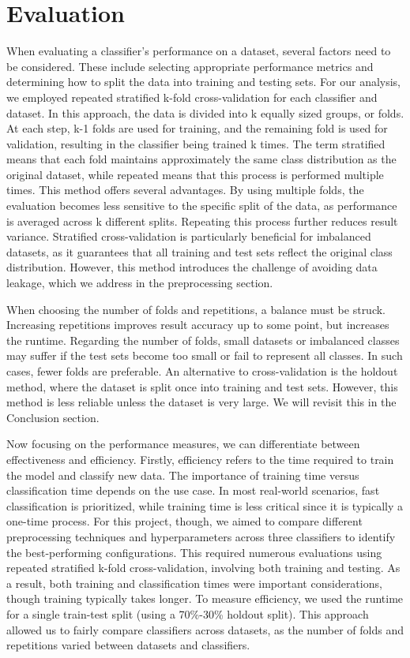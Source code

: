 \documentclass[a4paper,10pt]{article}
\begin{document}
\section{Evaluation}

When evaluating a classifier's performance on a dataset, several factors need to be considered. These include selecting appropriate performance metrics and determining how to split the data into training and testing sets. For our analysis, we employed repeated stratified k-fold cross-validation for each classifier and dataset. In this approach, the data is divided into k equally sized groups, or folds. At each step, k-1 folds are used for training, and the remaining fold is used for validation, resulting in the classifier being trained k times. The term stratified means that each fold maintains approximately the same class distribution as the original dataset, while repeated means that this process is performed multiple times. This method offers several advantages. By using multiple folds, the evaluation becomes less sensitive to the specific split of the data, as performance is averaged across k different splits. Repeating this process further reduces result variance. Stratified cross-validation is particularly beneficial for imbalanced datasets, as it guarantees that all training and test sets reflect the original class distribution. However, this method introduces the challenge of avoiding data leakage, which we address in the preprocessing section.

When choosing the number of folds and repetitions, a balance must be struck. Increasing repetitions improves result accuracy up to some point, but increases the runtime. Regarding the number of folds, small datasets or imbalanced classes may suffer if the test sets become too small or fail to represent all classes. In such cases, fewer folds are preferable. An alternative to cross-validation is the holdout method, where the dataset is split once into training and test sets. However, this method is less reliable unless the dataset is very large. We will revisit this in the Conclusion section.

Now focusing on the performance measures, we can differentiate between effectiveness and efficiency. Firstly, efficiency refers to the time required to train the model and classify new data. The importance of training time versus classification time depends on the use case. In most real-world scenarios, fast classification is prioritized, while training time is less critical since it is typically a one-time process.
For this project, though, we aimed to compare different preprocessing techniques and hyperparameters across three classifiers to identify the best-performing configurations. This required numerous evaluations using repeated stratified k-fold cross-validation, involving both training and testing. As a result, both training and classification times were important considerations, though training typically takes longer. To measure efficiency, we used the runtime for a single train-test split (using a 70\%-30\% holdout split). This approach allowed us to fairly compare classifiers across datasets, as the number of folds and repetitions varied between datasets and classifiers.
\end{document}
